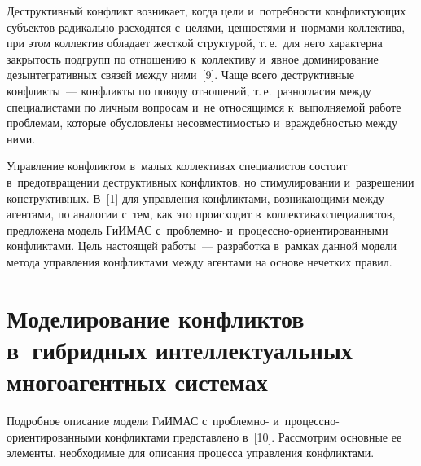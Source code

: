 \begin{multicols}{2}
  Деструктивный конфликт возникает, когда цели и~по\-треб\-но\-сти 
конф\-лик\-ту\-ющих субъектов радикально расходятся с~целями, ценностями 
и~нормами коллектива, при этом коллектив обладает \mbox{жесткой} структурой, 
т.\,е.\ для него характерна закрытость подгрупп по отношению к~коллективу 
и~явное доминирование дезынтегративных связей между ними~[9]. Чаще всего 
деструктивные конфликты~--- конфликты по поводу отношений, т.\,е.\ 
разногласия между специалистами по личным вопросам и~не относящимся 
к~выполняемой работе проб\-ле\-мам, которые обусловлены не\-со\-вмес\-ти\-мостью 
и~враж\-деб\-ностью между ними.
  
  Управление конфликтом в~малых коллективах специалистов состоит 
в~предотвращении деструктивных конфликтов, но стимулировании 
и~разрешении конструктивных. В~[1] для управ\-ле\-ния конфликтами, 
возникающими между агентами, по аналогии с~тем, как это происходит 
в~коллективах\linebreak специалистов, предложена модель \mbox{ГиИМАС}  
с~проб\-лем\-но- и~про\-цес\-сно-ори\-ен\-ти\-ро\-ван\-ны\-ми конфликтами. 
\mbox{Цель} на\-сто\-ящей работы~--- разработка в~рамках данной модели метода 
управ\-ле\-ния \mbox{конфликтами} между агентами на основе нечетких правил.

\section{Моделирование конфликтов в~гибридных 
интеллектуальных многоагентных системах}
  
  Подробное описание модели \mbox{ГиИМАС} с~проб\-лем\-но-
  и~про\-цес\-сно-ори\-ен\-ти\-ро\-ван\-ны\-ми конфликтами пред\-став\-ле\-но 
в~[10]. Рассмотрим основные ее элементы, необходимые для описания 
процесса управ\-ле\-ния конфликтами. 
  

\end{multicols}
